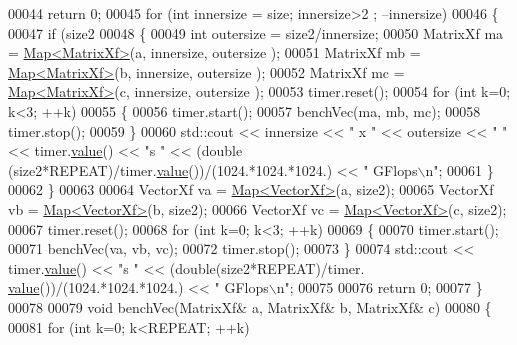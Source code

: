 \begin{DoxyCode}
00044     \textcolor{keywordflow}{return} 0;
00045     \textcolor{keywordflow}{for} (\textcolor{keywordtype}{int} innersize = size; innersize>2 ; --innersize)
00046     \{
00047         \textcolor{keywordflow}{if} (size2%
00048         \{
00049             \textcolor{keywordtype}{int} outersize = size2/innersize;
00050             MatrixXf ma = \hyperlink{group___core___module_class_eigen_1_1_map}{Map<MatrixXf>}(a, innersize, outersize );
00051             MatrixXf mb = \hyperlink{group___core___module_class_eigen_1_1_map}{Map<MatrixXf>}(b, innersize, outersize );
00052             MatrixXf mc = \hyperlink{group___core___module_class_eigen_1_1_map}{Map<MatrixXf>}(c, innersize, outersize );
00053             timer.reset();
00054             \textcolor{keywordflow}{for} (\textcolor{keywordtype}{int} k=0; k<3; ++k)
00055             \{
00056                 timer.start();
00057                 benchVec(ma, mb, mc);
00058                 timer.stop();
00059             \}
00060             std::cout << innersize << \textcolor{stringliteral}{" x "} << outersize << \textcolor{stringliteral}{"  "} << timer.\hyperlink{class_eigen_1_1_bench_timer_a26760f963ed8b64c126159bfea57735e}{value}() << \textcolor{stringliteral}{"s   "} << (double
      (size2*REPEAT)/timer.\hyperlink{class_eigen_1_1_bench_timer_a26760f963ed8b64c126159bfea57735e}{value}())/(1024.*1024.*1024.) << \textcolor{stringliteral}{" GFlops\(\backslash\)n"};
00061         \}
00062     \}
00063     
00064     VectorXf va = \hyperlink{group___core___module_class_eigen_1_1_map}{Map<VectorXf>}(a, size2);
00065     VectorXf vb = \hyperlink{group___core___module_class_eigen_1_1_map}{Map<VectorXf>}(b, size2);
00066     VectorXf vc = \hyperlink{group___core___module_class_eigen_1_1_map}{Map<VectorXf>}(c, size2);
00067     timer.reset();
00068     \textcolor{keywordflow}{for} (\textcolor{keywordtype}{int} k=0; k<3; ++k)
00069     \{
00070         timer.start();
00071         benchVec(va, vb, vc);
00072         timer.stop();
00073     \}
00074     std::cout << timer.\hyperlink{class_eigen_1_1_bench_timer_a26760f963ed8b64c126159bfea57735e}{value}() << \textcolor{stringliteral}{"s   "} << (double(size2*REPEAT)/timer.
      \hyperlink{class_eigen_1_1_bench_timer_a26760f963ed8b64c126159bfea57735e}{value}())/(1024.*1024.*1024.) << \textcolor{stringliteral}{" GFlops\(\backslash\)n"};
00075 
00076     \textcolor{keywordflow}{return} 0;
00077 \}
00078 
00079 \textcolor{keywordtype}{void} benchVec(MatrixXf& a, MatrixXf& b, MatrixXf& c)
00080 \{
00081     \textcolor{keywordflow}{for} (\textcolor{keywordtype}{int} k=0; k<REPEAT; ++k)

\end{DoxyCode}
